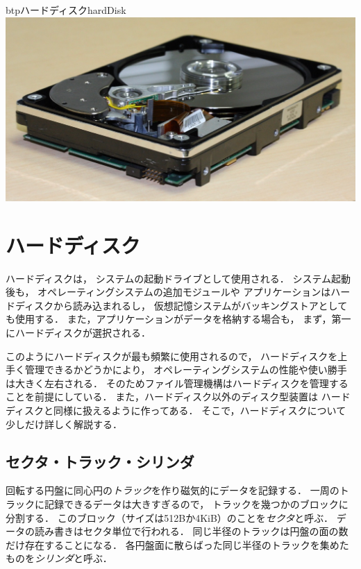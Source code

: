 \begin{enumerate}
  \begin{myfig}{btp}{ハードディスク}{hardDisk}
    \includegraphics[scale=0.3]{Fig/hardDisk.jpg}
  \end{myfig}

\end{enumerate}

\section{ハードディスク}
ハードディスクは，
システムの起動ドライブとして使用される．
システム起動後も，
オペレーティングシステムの追加モジュールや
アプリケーションはハードディスクから読み込まれるし，
仮想記憶システムがバッキングストアとしても使用する．
また，アプリケーションがデータを格納する場合も，
まず，第一にハードディスクが選択される．

このようにハードディスクが最も頻繁に使用されるので，
ハードディスクを上手く管理できるかどうかにより，
オペレーティングシステムの性能や使い勝手は大きく左右される．
そのためファイル管理機構はハードディスクを管理することを前提にしている．
また，ハードディスク以外のディスク型装置は
ハードディスクと同様に扱えるように作ってある．
そこで，ハードディスクについて少しだけ詳しく解説する．

\subsection{セクタ・トラック・シリンダ}
回転する円盤に同心円の\emph{トラック}を作り磁気的にデータを記録する．
一周のトラックに記録できるデータは大きすぎるので，
トラックを幾つかのブロックに分割する．
このブロック（サイズは512Bか4KiB）のことを\emph{セクタ}と呼ぶ．
データの読み書きはセクタ単位で行われる．
同じ半径のトラックは円盤の面の数だけ存在することになる．
各円盤面に散らばった同じ半径のトラックを集めたものを\emph{シリンダ}と呼ぶ．

